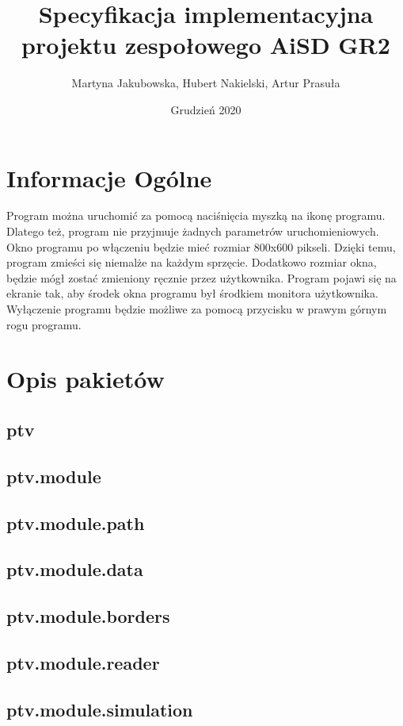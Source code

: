 \documentclass[]{article}
\title{Specyfikacja implementacyjna projektu zespołowego \textbf{AiSD GR2}}
\author{Martyna Jakubowska, Hubert Nakielski, Artur Prasuła}
\date{Grudzień 2020}
\begin{document}
    \maketitle
    
    \section{Informacje Ogólne}
    Program można uruchomić za pomocą naciśnięcia myszką na ikonę programu.
    Dlatego też, program nie przyjmuje żadnych parametrów uruchomieniowych.
    Okno programu po włączeniu będzie mieć rozmiar 800x600 pikseli.
    Dzięki temu, program zmieści się niemalże na każdym sprzęcie.
    Dodatkowo rozmiar okna, będzie mógł zostać zmieniony ręcznie przez użytkownika.
    Program pojawi się na ekranie tak, aby środek okna programu był środkiem monitora użytkownika.
    Wyłączenie programu będzie możliwe za pomocą przycisku w prawym górnym rogu programu.
    
    
    \section{Opis pakietów}
        \subsection{ptv}
        \subsection{ptv.module}
        \subsection{ptv.module.path} %
        \subsection{ptv.module.data} %
        \subsection{ptv.module.borders} %
        \subsection{ptv.module.reader} %
        \subsection{ptv.module.simulation} %
\end{document}
